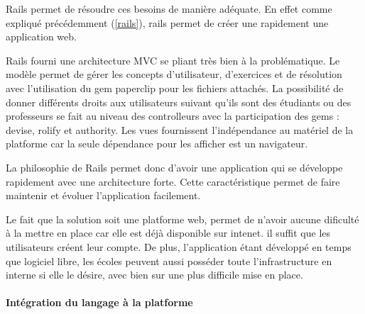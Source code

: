 Rails permet de résoudre ces besoins de manière adéquate. En effet comme expliqué précédemment (\ref{rails}), rails permet de créer une rapidement une application web.

Rails fourni une architecture MVC se pliant très bien à la problématique. Le modèle permet de gérer les concepts d'utilisateur, d'exercices et de résolution avec l'utilisation du gem paperclip pour les fichiers attachés.  La possibilité de donner différents droits aux utilisateurs suivant qu'ils sont des étudiants ou des professeurs se fait au niveau des controlleurs avec la participation des gems : devise, rolify et authority. Les vues fournissent l'indépendance au matériel de la platforme car la seule dépendance pour les afficher est un navigateur.

La philosophie de Rails permet donc d'avoir une application qui se développe rapidement avec une architecture forte. Cette caractéristique permet de faire maintenir et évoluer l'application facilement.

Le fait que la solution soit une platforme web, permet de n'avoir aucune dificulté à la mettre en place car elle est déjà disponible sur intenet. il suffit que les utilisateurs créent leur compte. De plus, l'application étant développé en temps que logiciel libre, les écoles peuvent aussi posséder toute l'infrastructure en interne si elle le désire, avec bien sur une plus difficile mise en place.

\paragraph{Intégration du langage à la platforme}
